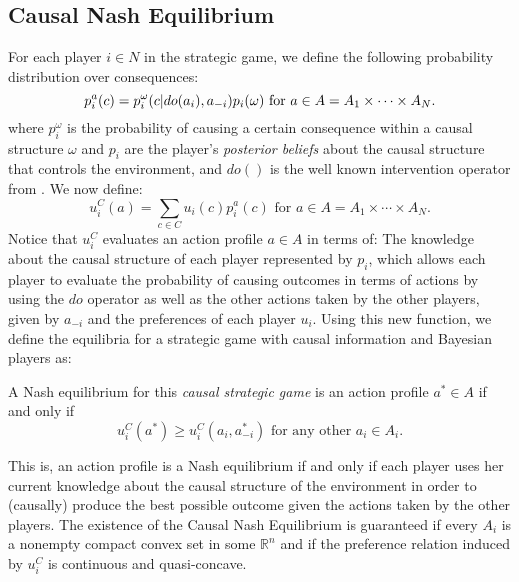 \documentclass{svjour3}                     %
\begin{document}
\subsection{Causal Nash Equilibrium}
For each player $i \in N$ in the strategic game, we define the following probability distribution over consequences:
\begin{equation}{\label{causal_utility}}
p^a_i (c) =  p^\omega_i (c | do(a_i), a_{-i}) p_i(\omega)\textrm{ for } a \in A=A_1 \times \cdots \times A_N.
\end{equation}
where $p^\omega_i$ is the probability of causing a certain consequence within a causal structure $\omega$ and $p_i$ are the player's \textit{posterior beliefs} about the causal structure that controls the environment, and $do()$ is the well known intervention operator from \cite{pearl2009causality}. We now define:
\begin{equation}
u^C_i (a) = \sum_{c \in C}  u_i(c) p^a_i (c) \textrm{ for } a \in A=A_1 \times \cdots \times A_N.
\end{equation}
Notice that $u^C_i$ evaluates an action profile $a \in A$ in terms of: The knowledge about the causal structure of each player represented by $p_i$, which allows each player to evaluate the probability of causing outcomes in terms of actions by using the $do$ operator as well as the other actions taken by the other players, given by $a_{-i}$ and the preferences of each player $u_i$. Using this new function, we define the equilibria for a strategic game with causal information and Bayesian players as:
\begin{definition}
A Nash equilibrium for this \textit{causal strategic game} is an action profile $a^\ast \in A$ if and only if
\begin{equation}
 u^C_i(a^\ast) \geq u^C_i(a_i, a^\ast_{-i}) \textrm{ for any other } a_i \in A_i. 
 \end{equation}
\end{definition}
This is, an action profile is a Nash equilibrium if and only if each player uses her current knowledge about the causal structure of the environment in order to (causally) produce the best possible outcome given the actions taken by the other players. The existence of the Causal Nash Equilibrium is guaranteed if every $A_i$ is a nonempty compact convex set in some $\mathbb{R}^n$ and if the preference relation induced by $u^C_i$ is continuous and quasi-concave.
\end{document}
